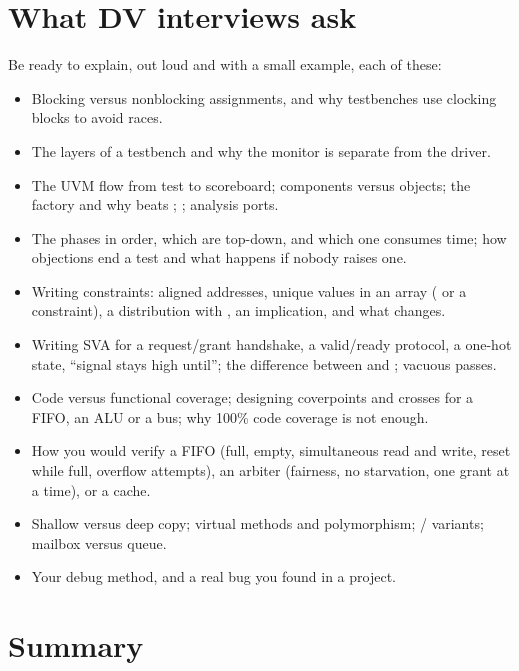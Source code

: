 \section{What DV interviews ask}

Be ready to explain, out loud and with a small example, each of these:
\begin{itemize}
  \item Blocking versus nonblocking assignments, and why testbenches use clocking blocks to avoid races.
  \item The layers of a testbench and why the monitor is separate from the driver.
  \item The UVM flow from test to scoreboard; components versus objects; the factory and why  beats ; ; analysis ports.
  \item The phases in order, which are top-down, and which one consumes time; how objections end a test and what happens if nobody raises one.
  \item Writing constraints: aligned addresses, unique values in an array ( or a  constraint), a distribution with , an implication, and what  changes.
  \item Writing SVA for a request/grant handshake, a valid/ready protocol, a one-hot state, ``signal stays high until''; the difference between \code{|->} and \code{|=>}; vacuous passes.
  \item Code versus functional coverage; designing coverpoints and crosses for a FIFO, an ALU or a bus; why 100\% code coverage is not enough.
  \item How you would verify a FIFO (full, empty, simultaneous read and write, reset while full, overflow attempts), an arbiter (fairness, no starvation, one grant at a time), or a cache.
  \item Shallow versus deep copy; virtual methods and polymorphism; / variants; mailbox versus queue.
  \item Your debug method, and a real bug you found in a project.
\end{itemize}

\section{Summary}

